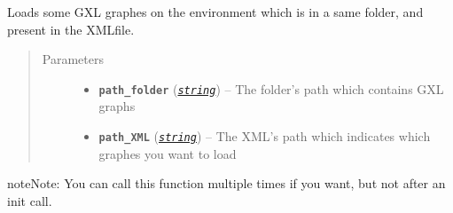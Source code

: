 \documentclass[letterpaper,10pt,english]{sphinxmanual}
\begin{document}
\begin{fulllineitems}
\label{doc:gedlibpy.load_GXL_graphs}
Loads some GXL graphes on the environment which is in a same folder, and present in the XMLfile.
\begin{quote}\begin{description}
\item[{Parameters}] \leavevmode\begin{itemize}
\item {} 
\textbf{\texttt{path\_folder}} (\href{https://docs.python.org/3/library/string.html\#module-string}{\emph{\texttt{string}}}) -- The folder's path which contains GXL graphs

\item {} 
\textbf{\texttt{path\_XML}} (\href{https://docs.python.org/3/library/string.html\#module-string}{\emph{\texttt{string}}}) -- The XML's path which indicates which graphes you want to load

\end{itemize}

\end{description}\end{quote}

\begin{notice}{note}{Note:}
You can call this function multiple times if you want, but not after an init call.
\end{notice}

\end{fulllineitems}

\end{document}
